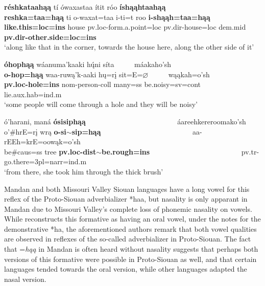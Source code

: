\begin{exe}
\begin{xlist}
\item\label{NonInstrumentalHaa4} \glll \textbf{réshkataahąą} tí ówaxastaa ítit róo \textbf{íshąąhtaahąą}\\
    \textbf{reshka=taa=hąą} ti o-waxat=taa i-ti=t roo \textbf{i-shąąh=taa=hąą}\\
    \textbf{\textnormal{\bfseries like.this}=loc=ins} \textnormal{house} pv.loc-\textnormal{form.a.point}=loc pv.dir-\textnormal{house}=loc dem.mid \textbf{pv.dir-\textnormal{\bfseries other.side}=loc=ins}\\
    \glt `along like that in the corner, towards the house here, along the other side of it' \citep[71]{trechter2012}
    
\item\label{NonInstrumentalHaa5} \glll \textbf{óhophąą} wáanuma'kaaki hų́ni síta ~ ~ ~   máakaho'sh\\
    \textbf{o-hop=hąą} waa-ruwą'k-aaki hų=rį sit=E=$\varnothing$ ~ ~ ~ wąąkah=o'sh\\
    \textbf{pv.loc-\textnormal{\bfseries hole}=ins} nom-\textnormal{person}-coll \textnormal{many}=ss \textnormal{be.noisy}=sv=cont ~ ~ ~  \textnormal{lie}.aux.hab=ind.m\\
    \glt `some people will come through a hole and they will be noisy' \citep[200]{hollow1973a}
    
\item\label{NonInstrumentalHaa6} \glll ó'harani, maná \textbf{ósisiphąą} ~ ~ ~ ~ ~ ~ ~ ~ ~ ~ ~ ~ ~ ~ ~   áareehkereroomako'sh\\
    o'\#hrE=rį wrą \textbf{o-si$\sim$sip=hąą} ~ ~ ~ ~ ~ ~ ~ ~ ~ ~ ~ ~ ~ ~ ~   aa-rEEh=krE=oowąk=o'sh\\
    \textnormal{be}\#caus=ss \textnormal{tree} \textbf{pv.loc-dist$\sim$\textnormal{\bfseries be.rough}=ins} ~ ~ ~ ~ ~ ~ ~ ~ ~ ~ ~ ~ ~ ~ ~ pv.tr-\textnormal{go.there}=3pl=narr=ind.m\\
    \glt `from there, she took him through the thick brush' \citep[49]{hollow1973b}

\end{xlist}

\end{exe}

Mandan and both Missouri Valley Siouan languages have a long vowel for this reflex of the Proto-Siouan adverbializer *haa, but nasality is only apparant in Mandan due to Missouri Valley's complete loss of phonemic nasality on vowels. While \citet{rankin2015} reconstructs this formative as having an oral vowel, under the notes for the demonstrative *ha, the aforementioned authors remark that both vowel qualities are observed in reflexes of the so-called adverbializer in Proto-Siouan. The fact that =\textit{hąą} in Mandan is often heard without nasality suggests that perhaps both versions of this formative were possible in Proto-Siouan as well, and that certain languages tended towards the oral version, while other languages adapted the nasal version. 


